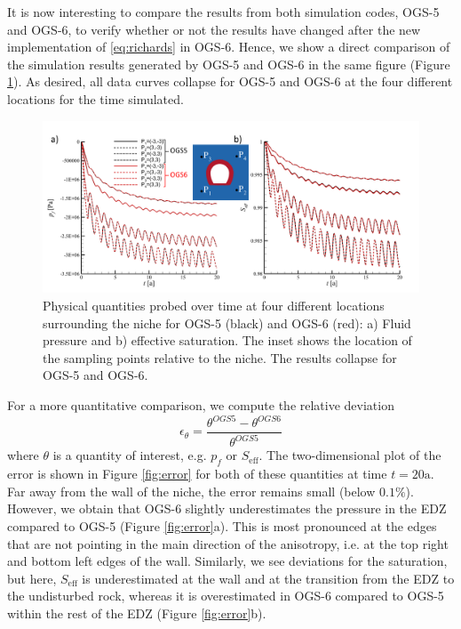 It is now interesting to compare the results from both simulation codes, OGS-5 and OGS-6, to verify whether or not the results have changed after the new implementation of \eqref{eq:richards} in OGS-6. Hence, we show a direct comparison of the simulation results generated by OGS-5 and OGS-6 in the same figure (Figure \ref{fig:cf_P_S}). As desired, all data curves collapse for OGS-5 and OGS-6 at the four different locations for the time simulated. 

%
\begin{figure}[t]
\includegraphics[width=\textwidth, trim=0.4cm 0.2cm 0.2cm 0, clip]{./figures/MEX10_cf_P_S.png}
\caption{Physical quantities probed over time at four different locations surrounding the niche for OGS-5 (black) and OGS-6 (red): a) Fluid pressure and b) effective saturation.  The inset shows the location of the sampling points relative to the niche. The results collapse for OGS-5 and OGS-6.}
\label{fig:cf_P_S}
\end{figure}
%

For a more quantitative comparison, we compute the relative deviation
%
\begin{equation}\label{eq:error}
\epsilon_\theta = \frac{\theta^{OGS5}-\theta^{OGS6}}{\theta^{OGS5}}
\end{equation}
%
where $\theta$ is a quantity of interest, e.g. $p_f$ or $S_\text{eff}$. The two-dimensional plot of the error is shown in Figure \ref{fig:error} for both of these quantities at time $t=20\text{a}$. Far away from the wall of the niche, the error remains small (below $0.1\%$). However, we obtain that OGS-6 slightly underestimates the pressure in the EDZ compared to OGS-5 (Figure \ref{fig:error}a). This is most pronounced at the edges that are not pointing in the main direction of the anisotropy, i.e. at the top right and bottom left edges of the wall. Similarly, we see deviations for the saturation, but here, $S_\text{eff}$ is underestimated at the wall and at the transition from the EDZ to the undisturbed rock, whereas it is overestimated in OGS-6 compared to OGS-5 within the rest of the EDZ (Figure \ref{fig:error}b).

